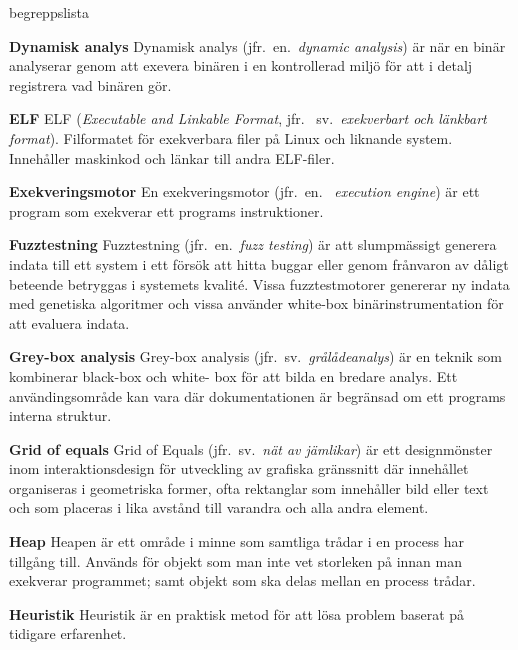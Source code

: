 \begin{labeling}{begreppslista}
    \item [\textbf{Dynamisk analys}] Dynamisk analys (jfr.\ en.\ \emph{dynamic
        analysis}) är när en binär analyserar genom att exevera binären i en
    kontrollerad miljö för att i detalj registrera vad binären gör.

    \item [\textbf{ELF}] ELF (\emph{Executable and Linkable Format},       jfr.
    \ sv.\ \emph{exekverbart och länkbart format}). Filformatet för exekverbara
    filer på Linux och liknande system. Innehåller maskinkod och länkar till
    andra ELF-filer.

    \item [\textbf{Exekveringsmotor}] En exekveringsmotor (jfr.\ en.
    \ \emph{execution engine}) är ett program som exekverar ett programs
    instruktioner.

    \item [\textbf{Fuzztestning}] Fuzztestning (jfr.\ en.\ \emph{fuzz testing})
    är att slumpmässigt generera indata till ett system i ett försök att hitta
    buggar eller genom frånvaron av dåligt beteende betryggas i systemets
    kvalité. Vissa fuzztestmotorer genererar ny indata med genetiska algoritmer
    och vissa använder white-box binärinstrumentation för att evaluera indata.

    \item [\textbf{Grey-box analysis}] Grey-box analysis (jfr.\ sv.\
    \emph{grålådeanalys}) är en teknik som kombinerar black-box och white-
    box för att bilda en bredare analys. Ett användingsområde kan vara där
    dokumentationen är begränsad om ett programs interna struktur.

    \item [\textbf{Grid of equals}] Grid of Equals (jfr.\ sv.\ \emph{nät av
        jämlikar}) är ett designmönster inom interaktionsdesign för utveckling av
    grafiska gränssnitt där innehållet organiseras i geometriska former, ofta
    rektanglar som innehåller bild eller text och som placeras i lika avstånd
    till varandra och alla andra element.

    \item [\textbf{Heap}] Heapen är ett område i minne som samtliga trådar i
    en process har tillgång till. Används för objekt som man inte vet storleken på
    innan man exekverar programmet; samt objekt som ska delas mellan en process
    trådar.

    \item [\textbf{Heuristik}] Heuristik är en praktisk metod för att lösa
    problem baserat på tidigare erfarenhet.


\end{labeling}

